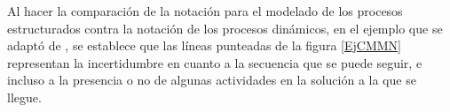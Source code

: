 Al hacer la comparación de la notación para el modelado de los procesos estructurados contra la notación de los procesos dinámicos, en el ejemplo que se adaptó de \citet{Cmmn11}, se establece que las líneas punteadas de la figura \ref{EjCMMN} representan la incertidumbre en cuanto a la secuencia que se puede seguir, e incluso a la presencia o no de algunas actividades en la solución a la que se llegue.





